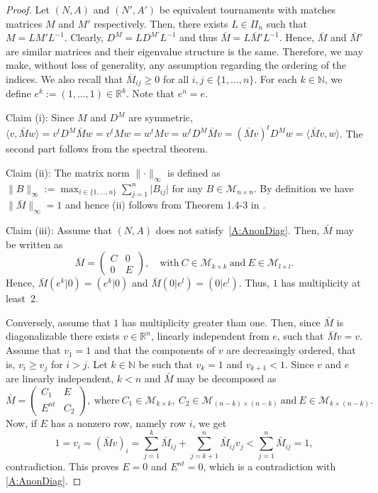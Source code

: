 \documentclass[a4paper,10pt]{article}
\theoremstyle{remark}
\providecommand{\norm}[1]{\lVert#1\rVert}
\newcommand{\TM}{A} %
\newcommand{\MM}{M} %
\newcommand{\DM}{D^\MM} %
\newcommand{\MS}{\mathcal M} %
\begin{document}
\begin{proof}
Let $(N,\TM)$ and $(N',\TM')$ be equivalent tournaments with
matches matrices $\MM$ and $\MM'$ respectively. Then, there exists
$L\in\Pi_n$ such that $\MM=L\MM'L^{-1}$. Clearly,
$\DM=LD^{M'}L^{-1}$ and thus $\bar{\MM}=L\bar{\MM}'L^{-1}$. Hence,
$\bar{\MM}$ and $\bar{\MM}'$ are similar matrices and their eigenvalue
structure is the same. Therefore, we may make, without loss of
generality, any assumption regarding the ordering of the indices.
We also recall that $\bar{\MM}_{ij}\geq 0$ for all
$i,j\in\{1,\dots,n\}$. For each $k \in \mathbb{N}$, we define $e^k:=(1,\dots,1)\in \mathbb{R}^k$. Note that
$e^n=e$.

Claim (i): Since $\MM$ and $\DM$ are symmetric, $\langle v,\bar
{\MM}w\rangle= v^t \DM\bar {\MM} w=v^t \MM w=w^t \MM v=w^t \DM\bar
{\MM}v=(\bar {\MM}v)^t\DM w=\langle \bar {\MM}v,w\rangle$. The
second part follows from the spectral theorem.

Claim (ii): The matrix norm $\norm\cdot_\infty$ is defined as
$\norm{B}_\infty:=\max_{i\in \{1,\ldots,n\}} \sum_{j=1}^n \lvert
B_{ij} \rvert$ for any $B\in\MS_{n\times n}$. By
definition we have $\norm{\bar {\MM}}_\infty=1$ and hence (ii)
follows from Theorem 1.4-3 in \cite{Ciarlet:1989}.

Claim (iii): Assume that $(N,\TM)$ does not
satisfy~\ref{A:AnonDiag}. Then, $\bar {\MM}$ may be written as
\[
\bar {\MM}=\left(\begin{array}{c|c}C&0\\ \hline
0&E\end{array}\right),\quad\mbox{with}\ C\in\MS_{k\times
k}\ \mbox{and}\ E\in\MS_{l\times l}.
\]
Hence, $\bar {\MM}(e^k|0)=(e^k|0)$ and $\bar
{\MM}(0|e^l)=(0|e^l)$. Thus, $1$ has multiplicity at least~$2$.

Conversely, assume that $1$ has multiplicity greater than one.
Then, since $\bar {\MM}$ is diagonalizable there exists $v\in \mathbb
R^n$, linearly independent from $e$, such that $\bar {\MM}v=v$.
Assume that $v_1=1$ and that the components of $v$ are
decreasingly ordered, that is, $v_i\geq v_j$ for $i>j$. Let $k\in
\mathbb N$ be such that $v_k=1$ and $v_{k+1}<1$. Since $v$ and $e$
are linearly independent, $k<n$ and $\bar {\MM}$ may be decomposed as
\begin{equation}\label{eqDecomposition}
\bar {\MM}=\left(\begin{array}{c|c}
C_1&E\\
\hline E^{nt}&C_2
\end{array}\right),\ \mbox{where}\ C_1\in\MS_{k\times k},\
C_2\in\MS_{(n-k)\times (n-k)}\ \mbox{and}\ E
\in\MS_{k\times (n-k)}.
\end{equation}
Now, if $E$ has a nonzero row, namely row $i$, we get
\[
1=v_i=(\bar {\MM}v)_i=\sum_{j=1}^k\bar {\MM}_{ij}
+\sum_{j=k+1}^n\bar {\MM}_{ij}v_j<\sum_{j=1}^n\bar {\MM}_{ij}=1,
\]
contradiction. This proves $E=0$ and $E^{nt}=0$, which is a
contradiction with \ref{A:AnonDiag}.


\end{proof}
\end{document}
